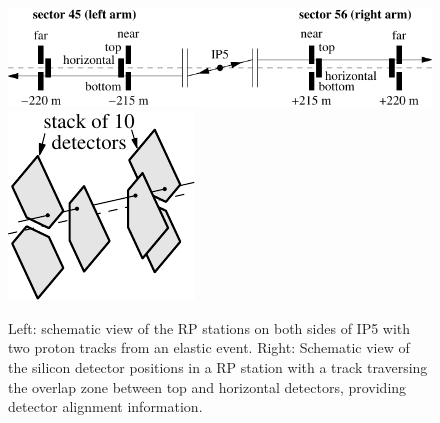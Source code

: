 \begin{figure}
\begin{center}
\includegraphics{fig/elastic_principle.pdf}
\hfil
\includegraphics{fig/stationScheme.pdf}
\caption{%
Left: schematic view of the RP stations on both sides of IP5 with two proton tracks from an elastic event. Right: Schematic view of the silicon detector positions in a RP station with a track traversing the overlap zone between top and horizontal detectors, providing detector alignment information. 
}
\label{fig:rpsketch}
\end{center}
\end{figure}
